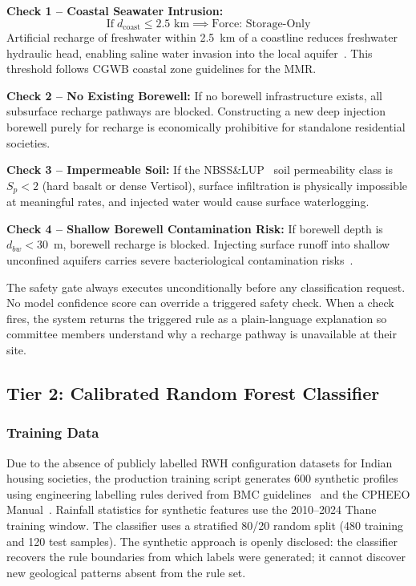 ﻿\documentclass[conference]{IEEEtran}
\begin{document}
\textbf{Check 1 -- Coastal Seawater Intrusion:}
\begin{equation}
  \text{If}\;d_{\text{coast}} \le 2.5\text{ km}
  \implies \text{Force: Storage-Only}
  \label{eq:coastal}
\end{equation}
Artificial recharge of freshwater within 2.5~km of a coastline reduces freshwater hydraulic head, enabling saline water invasion into the local aquifer~\cite{cgwb2022}. This threshold follows CGWB coastal zone guidelines for the MMR.

\textbf{Check 2 -- No Existing Borewell:} If no borewell infrastructure exists, all subsurface recharge pathways are blocked. Constructing a new deep injection borewell purely for recharge is economically prohibitive for standalone residential societies.

\textbf{Check 3 -- Impermeable Soil:} If the NBSS\&LUP~\cite{nbsslup} soil permeability class is $S_p < 2$ (hard basalt or dense Vertisol), surface infiltration is physically impossible at meaningful rates, and injected water would cause surface waterlogging.

\textbf{Check 4 -- Shallow Borewell Contamination Risk:} If borewell depth is $d_{bw} < 30$~m, borewell recharge is blocked. Injecting surface runoff into shallow unconfined aquifers carries severe bacteriological contamination risks~\cite{cpheeo2024}.

The safety gate always executes unconditionally before any classification request. No model confidence score can override a triggered safety check. When a check fires, the system returns the triggered rule as a plain-language explanation so committee members understand why a recharge pathway is unavailable at their site.

\subsection{Tier 2: Calibrated Random Forest Classifier}

\subsubsection{Training Data}
Due to the absence of publicly labelled RWH configuration datasets for Indian housing societies, the production training script generates 600 synthetic profiles using engineering labelling rules derived from BMC guidelines~\cite{mumbai2024} and the CPHEEO Manual~\cite{cpheeo2024}. Rainfall statistics for synthetic features use the 2010--2024 Thane training window. The classifier uses a stratified 80/20 random split (480 training and 120 test samples). The synthetic approach is openly disclosed: the classifier recovers the rule boundaries from which labels were generated; it cannot discover new geological patterns absent from the rule set.
\end{document}
